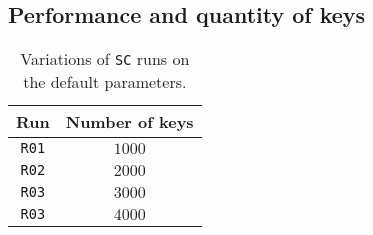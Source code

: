 \documentclass[11pt,twocolumn,letterpaper]{article}
\begin{document}
	\subsection{Performance and quantity of keys}
	\label{subsec:keyno_analysis}

	\begin{table}[h!]
		\caption{Variations of \texttt{SC} runs on the default parameters.}
		\label{tab:keyno_runs}
		\centering
		\begin{tabular}{cc}
			\hline
			\textbf{Run} & \textbf{Number of keys}\\
			\hline
			\texttt{R01} & $1000$\\
			\hline
			\texttt{R02} & $2000$\\
			\hline
			\texttt{R03} & $3000$\\
			\hline
			\texttt{R03} & $4000$\\
			\hline
		\end{tabular}
	\end{table}		

	\printbibliography
\end{document}
